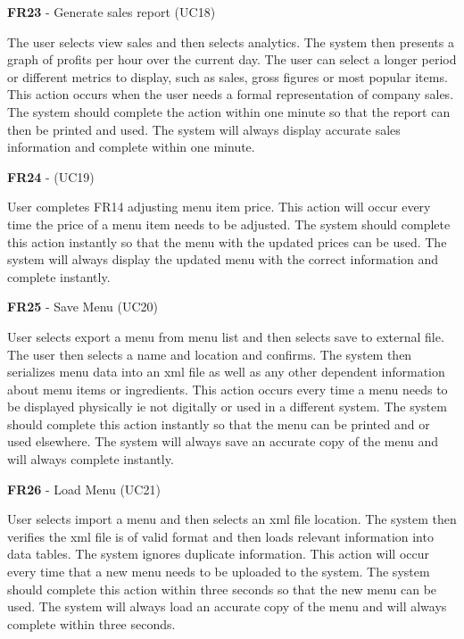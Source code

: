 \noindent \textbf{FR23} - Generate sales report (UC18)\\
\begin{small}
	The user selects view sales and then selects analytics. The system then presents a graph of profits per hour over the current day. The user can select a longer period or different metrics to display, such as sales, gross figures or most popular items. This action occurs when the user needs a formal representation of company sales. The system should complete the action within one minute so that the report can then be printed and used. The system will always display accurate sales information and complete within one minute.\\
\end{small}
\linebreak

\noindent \textbf{FR24} -  (UC19)\\
\begin{small}
	User completes FR14 adjusting menu item price. This action will occur every time the price of a menu item needs to be adjusted. The system should complete this action instantly so that the menu with the updated prices can be used. The system will always display the updated menu with the correct information and complete instantly.\\
\end{small}
\linebreak

\noindent \textbf{FR25} - Save Menu (UC20)\\
\begin{small}
	User selects export a menu from menu list and then selects save to external file. The user then selects a name and location and confirms. The system then serializes menu data into an xml file as well as any other dependent information about menu items or ingredients. This action occurs every time a menu needs to be displayed physically ie not digitally or used in a different system. The system should complete this action instantly so that the menu can be printed and or used elsewhere. The system will always save an accurate copy of the menu and will always complete instantly.\\
\end{small}
\linebreak

\noindent \textbf{FR26} - Load Menu (UC21)\\
\begin{small}
	User selects import a menu and then selects an xml file location. The system then verifies the xml file is of valid format and then loads relevant information into data tables. The system ignores duplicate information. This action will occur every time that a new menu needs to be uploaded to the system. The system should complete this action within three seconds so that the new menu can be used. The system will always load an accurate copy of the menu and will always complete within three seconds.\\
\end{small}
\linebreak

